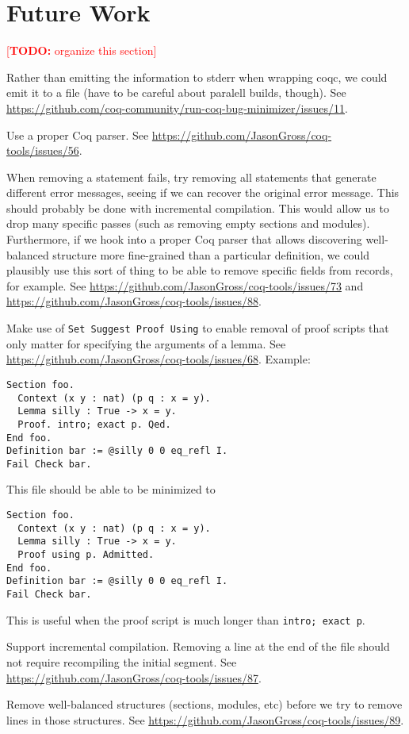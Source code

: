 \documentclass[a4paper,USenglish,cleveref,autoref,thm-restate]{lipics-v2021}
\makeatletter
\newcommand{\todo}[1]{%
\@latex@warning{TODO: \detokenize{#1} on page \thepage}%
\textcolor{red}{[\textbf{TODO:} #1]}}%
\makeatother
\begin{document}
\section{Future Work}\label{sec:future-work}
\todo{organize this section}

Rather than emitting the information to stderr when wrapping coqc, we could emit it to a file (have to be careful about paralell builds, though).
See \url{https://github.com/coq-community/run-coq-bug-minimizer/issues/11}.

Use a proper Coq parser.
See \url{https://github.com/JasonGross/coq-tools/issues/56}.

When removing a statement fails, try removing all statements that generate different error messages, seeing if we can recover the original error message.
This should probably be done with incremental compilation.
This would allow us to drop many specific passes (such as removing empty sections and modules).
Furthermore, if we hook into a proper Coq parser that allows discovering well-balanced structure more fine-grained than a particular definition, we could plausibly use this sort of thing to be able to remove specific fields from records, for example.
See \url{https://github.com/JasonGross/coq-tools/issues/73} and \url{https://github.com/JasonGross/coq-tools/issues/88}.

Make use of \verb|Set Suggest Proof Using| to enable removal of proof scripts that only matter for specifying the arguments of a lemma.
See \url{https://github.com/JasonGross/coq-tools/issues/68}.
Example:
\begin{verbatim}
Section foo.
  Context (x y : nat) (p q : x = y).
  Lemma silly : True -> x = y.
  Proof. intro; exact p. Qed.
End foo.
Definition bar := @silly 0 0 eq_refl I.
Fail Check bar.
\end{verbatim}
This file should be able to be minimized to
\begin{verbatim}
Section foo.
  Context (x y : nat) (p q : x = y).
  Lemma silly : True -> x = y.
  Proof using p. Admitted.
End foo.
Definition bar := @silly 0 0 eq_refl I.
Fail Check bar.
\end{verbatim}
This is useful when the proof script is much longer than \verb|intro; exact p|.

Support incremental compilation.
Removing a line at the end of the file should not require recompiling the initial segment.
See \url{https://github.com/JasonGross/coq-tools/issues/87}.

Remove well-balanced structures (sections, modules, etc) before we try to remove lines in those structures.
See \url{https://github.com/JasonGross/coq-tools/issues/89}.
\end{document}
